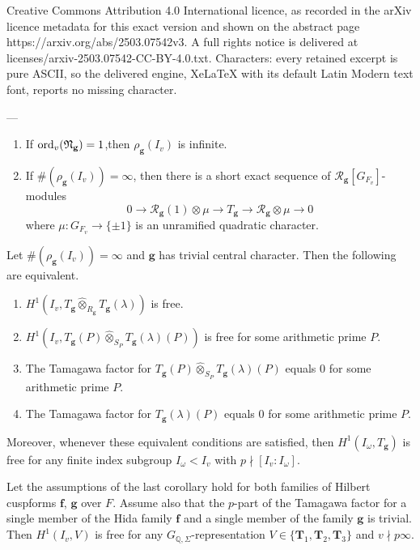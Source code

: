 \documentclass[10pt,a4paper]{amsart}
\DeclareMathOperator{\ord}{ord}
\newcommand{\Q}{\mathbb{Q}}
\newcommand{\R}{\mathcal{R}}
\newcommand{\T}{\mathbf{T}}
\newcommand{\f}{\mathbf{f}}
\newcommand{\g}{\mathbf{g}}
\begin{document}
Creative Commons Attribution 4.0 International licence, as recorded in the arXiv licence metadata for this exact version and shown on the abstract page https://arxiv.org/abs/2503.07542v3. A full rights notice is delivered at licenses/arxiv-2503.07542-CC-BY-4.0.txt. Characters: every retained excerpt is pure ASCII, so the delivered engine, XeLaTeX with its default Latin Modern text font, reports no missing character.
	\begin{prop}\label{prop:4.16}
		---
		\begin{enumerate}[(1)]
			\item If $\ord_{v}(\frak{N}_\g)=1 $,then $ \rho_\g(I_{v}) $ is infinite.
			\item If $ \#(\rho_\g(I_{v}))= \infty $, then there is a short exact sequence of $ \R_{\g}[G_{F_{v}}] $-modules
			$$ 0 \rightarrow \R_{\g}(1) \otimes \mu \rightarrow T_\g \rightarrow \R_{\g} \otimes \mu \rightarrow 0 $$
			where $ \mu \colon G_{F_v} \rightarrow \{\pm 1\} $ is an unramified quadratic character.
		\end{enumerate}
	\end{prop}

	\begin{cor}
		\label{cor:4.17}
		Let $ \#(\rho_\g(I_{v}))= \infty $ and $ \g  $ has trivial central character. Then the following are equivalent.
		\begin{enumerate}[(1)]
			\item $ H^1(I_{v}, T_\g \widehat{\otimes}_{R_\g} T_\g (\lambda)) $ is free.
			\item $ H^1(I_{v}, T_\g(P) \widehat{\otimes}_{S_{P}} T_\g(\lambda)(P)) $ is free for some arithmetic prime $ P $.
			\item The Tamagawa factor for $ T_\g(P) \widehat{\otimes}_{S_{P}} T_\g(\lambda)(P) $ equals 0 for some arithmetic prime $ P $.
			\item The Tamagawa factor for $ T_\g(\lambda)(P) $ equals 0 for some arithmetic prime $ P $.
		\end{enumerate}
		Moreover, whenever these equivalent conditions are satisfied, then $ H^1(I_{\omega}, T_\g) $ is free for any finite index subgroup $ I_\omega < I_v $ with $ p \nmid [I_v \colon I_\omega] $.
	\end{cor}

	\begin{thm}
		Let the assumptions of the last corollary hold for both families of Hilbert cuspforms $ \f $, $ \g $ over $ F $. Assume also that the $p$-part of the Tamagawa factor for a single member of the Hida family $\f$ and a single member of the family $\g$ is trivial. Then $H^1(I_v , V )$ is free for any $ G_{\Q,\Sigma} $-representation $V \in \{\T_1, \T_2, \T_3\}$ and $ v \nmid p\infty $.
	\end{thm}
\end{document}
